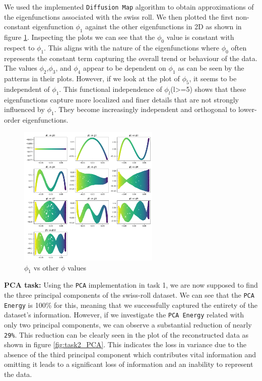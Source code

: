 We used the implemented \texttt{Diffusion Map} algorithm to obtain approximations of the eigenfunctions associated with the swiss roll. We then plotted the first non-constant eigenfunction $\phi_1$ against the other eigenfunctions in 2D as shown in figure \ref{fig:task2.21}. Inspecting the plots we can see that the $\phi_0$ value is constant with respect to $\phi_1$. This aligns with the nature of the eigenfunctions where $\phi_0$ often represents the constant term capturing the overall trend or behaviour of the data. The values $\phi_2$,$\phi_3$, and $\phi_4$ appear to be dependent on $\phi_1$ as can be seen by the patterns in their plots. However, if we look at the plot of $\phi_5$, it seems to be independent of $\phi_1$. This functional independence of $\phi_l$(l>=5) shows that these eigenfunctions capture more localized and finer details that are not strongly influenced by $\phi_1$. They become increasingly independent and orthogonal to lower-order eigenfunctions.\\

\begin{figure}[H]
    \centering
    \includegraphics[width=0.6\textwidth]{images/ex3task2_5000vals.png}
    \caption{$\phi_1$ vs other $\phi$ values}
    \label{fig:task2.21}
\end{figure}


\textbf{PCA task:} Using the \texttt{PCA} implementation in task 1, we are now supposed to find the three principal components of the swiss-roll dataset. We can see that the \texttt{PCA Energy} is 100\% for this, meaning that we successfully captured the entirety of the dataset's information. However, if we investigate the \texttt{PCA Energy} related with only two principal components, we can observe a substantial reduction of nearly \texttt{29\%}. This reduction can be clearly seen in the plot of the reconstructed data as shown in figure \ref{fig:task2_PCA}. This indicates the loss in variance due to the absence of the third principal component which contributes vital information and omitting it leads to a significant loss of information and an inability to represent the data. \\

